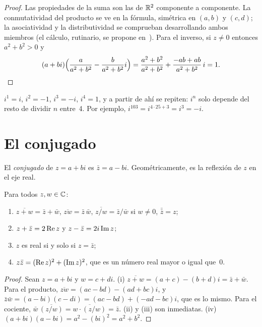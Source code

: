 \begin{proof}
Las propiedades de la suma son las de $\mathbb{R}^{2}$ componente a componente. La conmutatividad del producto se ve en la fórmula, simétrica en $(a,b)$ y $(c,d)$; la asociatividad y la distributividad se comprueban desarrollando ambos miembros (el cálculo, rutinario, se propone en~\cite[§5.1]{mit1803}). Para el inverso, si $z\ne0$ entonces $a^{2}+b^{2}>0$ y
\[
(a+bi)\Bigl(\frac{a}{a^{2}+b^{2}}-\frac{b}{a^{2}+b^{2}}i\Bigr)=\frac{a^{2}+b^{2}}{a^{2}+b^{2}}+\frac{-ab+ab}{a^{2}+b^{2}}\,i=1.\qedhere
\]
\end{proof}

\begin{ejemplo}[Potencias de $i$]\label{ej:potencias-i}
$i^{1}=i$, $i^{2}=-1$, $i^{3}=-i$, $i^{4}=1$, y a partir de ahí se repiten: $i^{n}$ solo depende del resto de dividir $n$ entre~4. Por ejemplo, $i^{103}=i^{4\cdot25+3}=i^{3}=-i$.
\end{ejemplo}

\section{El conjugado}

\begin{definicion}[Conjugado]
El \emph{conjugado} de $z=a+bi$ es $\bar z=a-bi$. Geométricamente, es la reflexión de $z$ en el eje real.
\end{definicion}

\begin{proposicion}\label{prop:conjugado}
Para todos $z,w\in\mathbb{C}$:
\begin{enumerate}
  \item $\overline{z+w}=\bar z+\bar w$, \quad $\overline{zw}=\bar z\,\bar w$, \quad $\overline{z/w}=\bar z/\bar w$ si $w\ne0$, \quad $\bar{\bar z}=z$;
  \item $z+\bar z=2\operatorname{Re} z$ y $z-\bar z=2i\operatorname{Im} z$;
  \item $z$ es real si y solo si $z=\bar z$;
  \item $z\bar z=(\operatorname{Re} z)^{2}+(\operatorname{Im} z)^{2}$, que es un número real mayor o igual que~0.
\end{enumerate}
\end{proposicion}

\begin{proof}
Sean $z=a+bi$ y $w=c+di$. (i) $\overline{z+w}=(a+c)-(b+d)i=\bar z+\bar w$. Para el producto, $\overline{zw}=(ac-bd)-(ad+bc)i$, y $\bar z\bar w=(a-bi)(c-di)=(ac-bd)+(-ad-bc)i$, que es lo mismo. Para el cociente, $\bar w\,\overline{(z/w)}=\overline{w\cdot(z/w)}=\bar z$. (ii) y (iii) son inmediatas. (iv) $(a+bi)(a-bi)=a^{2}-(bi)^{2}=a^{2}+b^{2}$.
\end{proof}

